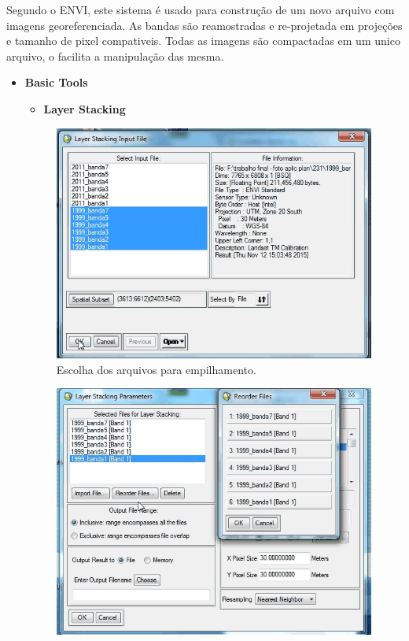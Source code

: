 \hspace{1.5cm}
Segundo o ENVI\cite{envi}, este sistema é usado para construção de um novo arquivo com imagens georeferenciada. As bandas são reamostradas e re-projetada em projeções e tamanho de pixel compativeis. Todas as imagens são compactadas em um unico arquivo, o facilita a manipulação das mesma. 

\begin{itemize}
\item \textbf{Basic Tools}
\begin{itemize}
\item\textbf{ Layer Stacking}\\

\end{itemize}
\begin{figure}[!htpb]
        \centering
        \includegraphics[scale=0.4]{imagens/empilhamento01.png}
        \caption{Escolha dos arquivos para empilhamento.}
        \label{empilhamento01}
\end{figure}        
\begin{figure}[!htpb]        
        \centering
        \includegraphics[scale=0.4]{imagens/empilhamento03.png}

\end{figure}
\end{itemize}
